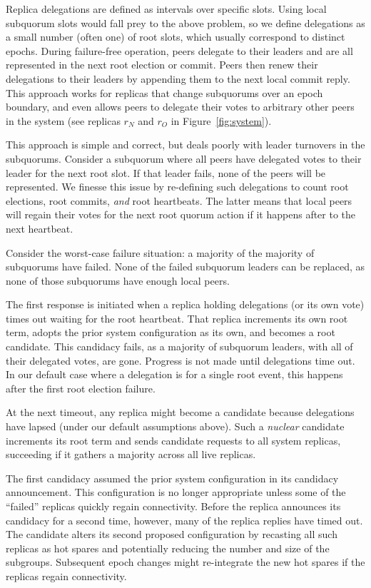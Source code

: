 \documentclass[11pt,conference]{IEEEtran}
\newcommand{\sub}{subquorum\xspace}
\newcommand{\subs}{subquorums\xspace}
\newcommand{\roo}{root quorum\xspace}
\begin{document}
Replica delegations are defined as intervals over specific slots.
Using local \sub slots would fall prey to the above problem, so we define
delegations as a small number (often one) of root slots, which usually
correspond to distinct epochs.
During failure-free operation, peers delegate to their leaders and are all
represented in the next root election or commit.
Peers then renew their delegations to their leaders by appending them to the
next local commit reply.
This approach works for replicas that change \subs over an epoch
boundary, and even allows peers to delegate their votes to arbitrary other
peers in the system (see replicas $r_N$ and $r_O$ in Figure~\ref{fig:system}).

This approach is simple and correct, but deals poorly with leader turnovers in
the \subs.
Consider a \sub where all peers have delegated votes to their leader
for the next root slot.
If that leader fails, none of the peers will be represented.
We finesse this issue by re-defining such delegations to count
root elections, root commits, \emph{and} root heartbeats.
The latter means that local peers will regain their votes for the next \roo
action if it happens after to the next heartbeat.

Consider the worst-case failure situation: a majority of the majority of \subs have
failed.
None of the failed \sub leaders can be replaced, as none of those \subs have
enough local peers.

The first response is initiated when a replica holding delegations (or its own
vote) times out waiting for the root heartbeat.
That replica increments its own root term, adopts the prior system
configuration as its own, and becomes a root candidate.
This candidacy fails, as a majority of \sub leaders, with all of their
delegated votes, are gone.
Progress is not made until delegations time out.
In our default case where a delegation is for a single root event, this
happens after the first root election failure.

At the next timeout, any replica might become a candidate because delegations have
lapsed (under our default assumptions above).
Such a \emph{nuclear} candidate increments its root term and
sends candidate requests to all system replicas,
succeeding if it gathers a majority across all live replicas.

The first candidacy assumed the prior system configuration in its candidacy
announcement.
This configuration is no longer appropriate unless some of the ``failed''
replicas quickly regain connectivity.
Before the replica announces its candidacy for a second time, however, many of
the replica replies have timed out.
The candidate alters its second proposed configuration by recasting all such
replicas as hot spares and potentially reducing the number and size of the
subgroups.
Subsequent epoch changes might re-integrate the new hot spares if the replicas
regain connectivity.
\end{document}
